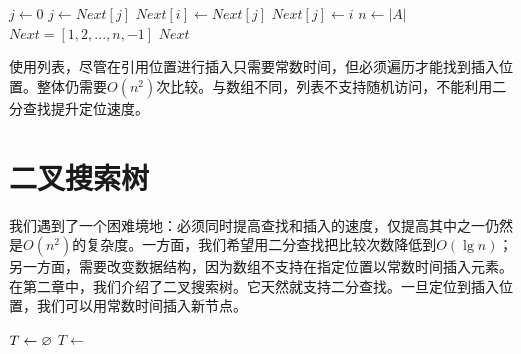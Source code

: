 \documentclass[b5paper]{ctexart}
\begin{document}
\begin{algorithmic}[1]
  \State $j \gets 0$ 
    \State $j \gets Next[j]$
  \EndWhile
  \State $Next[i] \gets Next[j]$
  \State $Next[j] \gets i$
\EndFunction
\Statex
{}
  \State $n \gets |A|$
  \State $Next = [1, 2, ..., n, -1]$ 
    \State {}
  \EndFor
  \State \Return $Next$
\EndFunction
\end{algorithmic}

使用列表，尽管在引用位置进行插入只需要常数时间，但必须遍历才能找到插入位置。整体仍需要$O(n^2)$次比较。与数组不同，列表不支持随机访问，不能利用二分查找提升定位速度。

\begin{Exercise}[label={ex:list-index-array-reorder}]
\end{Exercise}

\begin{Answer}[ref = {ex:list-index-array-reorder}]
\end{Answer}

\section{二叉搜索树}

我们遇到了一个困难境地：必须同时提高查找和插入的速度，仅提高其中之一仍然是$O(n^2)$的复杂度。一方面，我们希望用二分查找把比较次数降低到$O(\lg n)$；另一方面，需要改变数据结构，因为数组不支持在指定位置以常数时间插入元素。在第二章中，我们介绍了二叉搜索树。它天然就支持二分查找。一旦定位到插入位置，我们可以用常数时间插入新节点。

\begin{algorithmic}[1]
  \State $T \gets \varnothing$
    \State $T \gets $ 
  \EndFor
  \State \Return {}
\EndFunction
\end{algorithmic}
\end{document}
